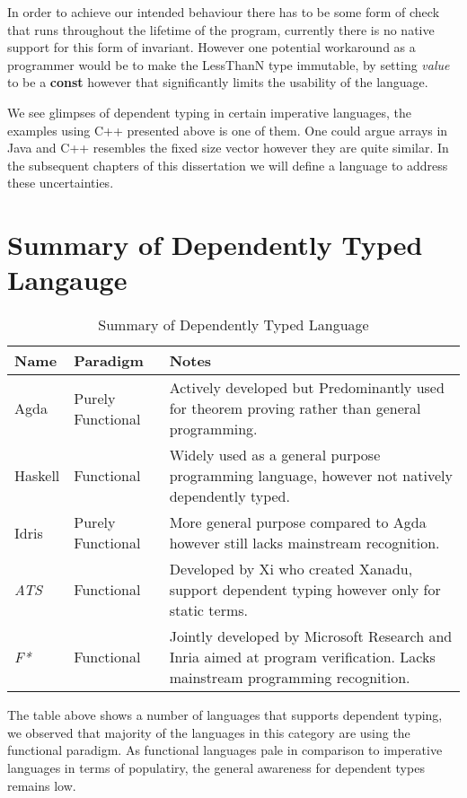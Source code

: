 \documentclass[a4paper,12pt]{report}
\begin{document}
\par
In order to achieve our intended behaviour there has to be some form of check 
that runs throughout the lifetime of the program, currently there is no native 
support for this form of invariant. However one potential workaround as a 
programmer would be to make the LessThanN type immutable, by setting \textit{value} 
to be a \textbf{const} however that significantly limits the usability of the 
language. 

\par
We see glimpses of dependent typing in certain imperative languages, the 
examples using C++ presented above is one of them. One could argue arrays in 
Java and C++ resembles the fixed size vector however they are quite similar. In 
the subsequent chapters of this dissertation we will define a language to 
address these uncertainties. 


\section{Summary of Dependently Typed Langauge}
\begin{table} [H]
  \begin{tabular}{|p{2cm}|p{2cm}|p{10cm}|}
    \hline
    \textbf{Name} & \textbf{Paradigm} & \textbf{Notes} \\ 
    \hline
    Agda & Purely Functional & Actively developed but 
      Predominantly used for theorem proving rather than general programming. \\ 
    \hline
    Haskell & Functional & Widely used as a general purpose programming language, however not natively dependently typed. \\ 
    \hline
    Idris & Purely Functional & More general purpose compared to Agda however 
      still lacks mainstream recognition. \\
    \hline
    \textit{ATS} \cite{ATS} & Functional & Developed by Xi who created Xanadu, 
      support dependent typing however only for static terms. \\
    \hline
    \textit{F*} \cite{FStar} & Functional & Jointly developed by Microsoft 
    Research and Inria aimed at program verification. Lacks mainstream 
    programming recognition.\\
    \hline
  \end{tabular}
  \caption{Summary of Dependently Typed Language}
\end{table}

\par
The table above shows a number of languages that supports dependent typing, we 
observed that majority of the languages in this category are using the 
functional paradigm. As functional languages pale in comparison to imperative 
languages in terms of populatiry, the general awareness for dependent types 
remains low. 
\end{document}
